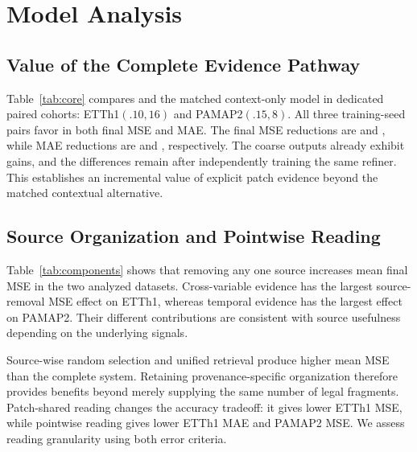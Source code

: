 \section{Model Analysis}\label{sec:analysis}
\subsection{Value of the Complete Evidence Pathway}
Table~\ref{tab:core} compares \Model{} and the matched context-only model in dedicated paired cohorts: ETTh1$(.10,16)$ and PAMAP2$(.15,8)$. All three training-seed pairs favor \Model{} in both final MSE and MAE. The final MSE reductions are \GainETTMSE{} and \GainPAMMSE{}, while MAE reductions are \GainETTMAE{} and \GainPAMMAE{}, respectively. The coarse outputs already exhibit gains, and the differences remain after independently training the same refiner. This establishes an incremental value of explicit patch evidence beyond the matched contextual alternative.

\begin{table}[t]
 \centering\small\setlength{\tabcolsep}{4pt}
 
 \caption{Paired evidence-pathway analysis. Both datasets use three training seeds and twenty shared test masks per model. The PAMAP2 mechanism cohort is separate from its formal benchmark cohort in Table~\ref{tab:formal}. Coarse and refined outputs come from the same selected model pair.}
 \label{tab:core}
\end{table}

\subsection{Source Organization and Pointwise Reading}
Table~\ref{tab:components} shows that removing any one source increases mean final MSE in the two analyzed datasets. Cross-variable evidence has the largest source-removal MSE effect on ETTh1, whereas temporal evidence has the largest effect on PAMAP2. Their different contributions are consistent with source usefulness depending on the underlying signals.

Source-wise random selection and unified retrieval produce higher mean MSE than the complete system. Retaining provenance-specific organization therefore provides benefits beyond merely supplying the same number of legal fragments. Patch-shared reading changes the accuracy tradeoff: it gives lower ETTh1 MSE, while pointwise reading gives lower ETTh1 MAE and PAMAP2 MSE. We assess reading granularity using both error criteria.

